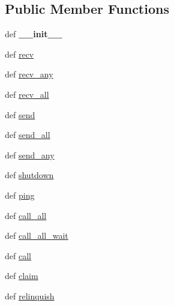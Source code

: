 \subsection*{Public Member Functions}
\begin{DoxyCompactItemize}
\item 
\hypertarget{classcheshire3_1_1parallel_1_1mp_task_manager_1_1_process_task_manager_a31ffcb4c5fea70548c5d21ce686e5026}{def {\bfseries \-\_\-\-\_\-init\-\_\-\-\_\-}}\label{classcheshire3_1_1parallel_1_1mp_task_manager_1_1_process_task_manager_a31ffcb4c5fea70548c5d21ce686e5026}

\item 
def \hyperlink{classcheshire3_1_1parallel_1_1mp_task_manager_1_1_process_task_manager_aaa3c0be1a420fe1c8edf1d47b3f401dc}{recv}
\item 
def \hyperlink{classcheshire3_1_1parallel_1_1mp_task_manager_1_1_process_task_manager_aefe73e58ab79274d14fb09f1c410cd16}{recv\-\_\-any}
\item 
def \hyperlink{classcheshire3_1_1parallel_1_1mp_task_manager_1_1_process_task_manager_a7f32fba76eef6daff8c1bb46f7a8b3ac}{recv\-\_\-all}
\item 
def \hyperlink{classcheshire3_1_1parallel_1_1mp_task_manager_1_1_process_task_manager_a6daa9df385c13b45d4c7cd90d611500c}{send}
\item 
def \hyperlink{classcheshire3_1_1parallel_1_1mp_task_manager_1_1_process_task_manager_af565797d7e3231598177b7e12a38fea1}{send\-\_\-all}
\item 
def \hyperlink{classcheshire3_1_1parallel_1_1mp_task_manager_1_1_process_task_manager_add615b936f645e5f6e17516b177d101b}{send\-\_\-any}
\item 
def \hyperlink{classcheshire3_1_1parallel_1_1mp_task_manager_1_1_process_task_manager_a536127426588621d1202946cbcb2d21c}{shutdown}
\item 
def \hyperlink{classcheshire3_1_1parallel_1_1mp_task_manager_1_1_process_task_manager_ad01eb292f1544724fa53cfd14b966d7e}{ping}
\item 
def \hyperlink{classcheshire3_1_1parallel_1_1mp_task_manager_1_1_process_task_manager_aab7389879dc68028dde0c77d47da45ec}{call\-\_\-all}
\item 
def \hyperlink{classcheshire3_1_1parallel_1_1mp_task_manager_1_1_process_task_manager_a5e1ddd438b42947a54e4df03d7cf044e}{call\-\_\-all\-\_\-wait}
\item 
def \hyperlink{classcheshire3_1_1parallel_1_1mp_task_manager_1_1_process_task_manager_a71ca06aa860331744402f3785da26aeb}{call}
\item 
def \hyperlink{classcheshire3_1_1parallel_1_1mp_task_manager_1_1_process_task_manager_a02d901c84cc61b79500a1dcf254b491d}{claim}
\item 
def \hyperlink{classcheshire3_1_1parallel_1_1mp_task_manager_1_1_process_task_manager_a947cd93adc6ca10cdc4e09e1ccf62f03}{relinquish}
\end{DoxyCompactItemize}
